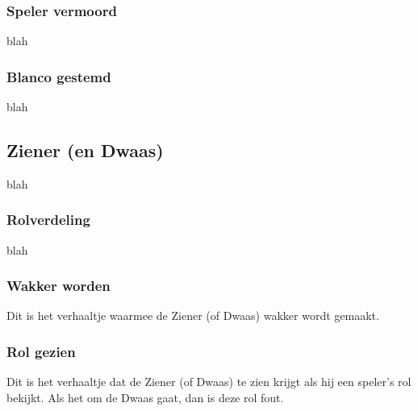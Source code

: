 \documentclass[12pt]{article}
\begin{document}
    \subsubsection{Speler vermoord}
    
      blah
    
    \subsubsection{Blanco gestemd}
    
      blah
  
  \subsection{Ziener (en Dwaas)}
    
      blah
  
    \subsubsection{Rolverdeling}
    
      blah
    
    \subsubsection{Wakker worden}
    
    Dit is het verhaaltje waarmee de Ziener (of Dwaas) wakker wordt gemaakt.
    
    \begin{center}
    \end{center}
        
    \subsubsection{Rol gezien}
    
    Dit is het verhaaltje dat de Ziener (of Dwaas) te zien krijgt als hij een speler's rol bekijkt. Als het om de Dwaas gaat, dan is deze rol fout.
    
\end{document}
